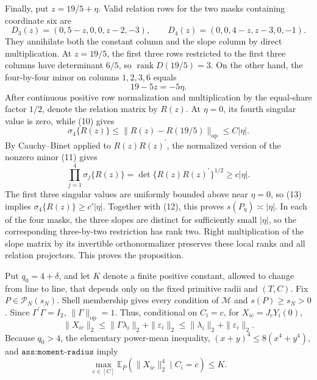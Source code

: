Finally, put \(z=19/5+\eta\). Valid relation rows for the two masks containing coordinate six are
\[
D_3(z)=(0,5-z,0,0,z-2,-3),
\qquad
D_4(z)=(0,0,4-z,z-3,0,-1).
\tag{10}
\]
They annihilate both the constant column and the slope column by direct multiplication. At \(z=19/5\), the first three rows restricted to the first three columns have determinant \(6/5\), so \(\operatorname{rank}D(19/5)=3\). On the other hand, the four-by-four minor on columns \(1,2,3,6\) equals
\[
19-5z=-5\eta.
\tag{11}
\]
After continuous positive row normalization and multiplication by the equal-share factor \(1/2\), denote the relation matrix by \(R(z)\). At \(\eta=0\), its fourth singular value is zero, while (10) gives
\[
\sigma_4\{R(z)\}
\leq\|R(z)-R(19/5)\|_{\mathrm{op}}
\leq C|\eta|.
\tag{12}
\]
By Cauchy--Binet applied to \(R(z)R(z)^{\prime}\), the normalized version of the nonzero minor (11) gives
\[
\prod_{j=1}^4\sigma_j\{R(z)\}
=\det\{R(z)R(z)^{\prime}\}^{1/2}
\geq c|\eta|.
\tag{13}
\]
The first three singular values are uniformly bounded above near \(\eta=0\), so (13) implies \(\sigma_4\{R(z)\}\geq c'|\eta|\). Together with (12), this proves \(s(P_\eta)\asymp|\eta|\). In each of the four masks, the three slopes are distinct for sufficiently small \(|\eta|\), so the corresponding three-by-two restriction has rank two. Right multiplication of the slope matrix by its invertible orthonormalizer preserves these local ranks and all relation projectors. This proves the proposition.

Put \(q_0=4+\delta\), and let \(K\) denote a finite positive constant, allowed to change from line to line, that depends only on the fixed primitive radii and \((T,C)\). Fix \(P\in\mathcal P_N(s_N)\). Shell membership gives every condition of \(\mathcal M\) and \(s(P)\geq s_N>0\). Since \(\Gamma^{\prime}\Gamma=I_2\), \(\|\Gamma\|_{\mathrm{op}}=1\). Thus, conditional on \(C_i=c\), for \(X_{ic}=J_cY_i(0)\),
\[
\|X_{ic}\|_2
\leq\|\Gamma\lambda_i\|_2+\|\varepsilon_i\|_2
\leq\|\lambda_i\|_2+\|\varepsilon_i\|_2.
\]
Because \(q_0>4\), the elementary power-mean inequality, \((x+y)^4\leq8(x^4+y^4)\), and \(\texttt{ass:moment-radius}\) imply
\[
\max_{c\in[C]}\mathbb E_P(\|X_{ic}\|_2^4\mid C_i=c)\leq K.
\tag{1}
\]

